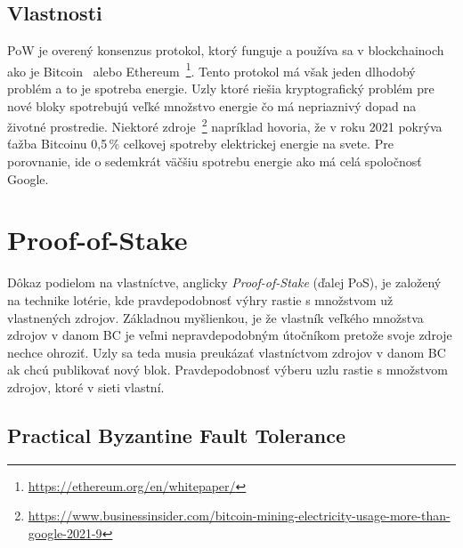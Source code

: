 \subsection{Vlastnosti}
PoW je overený konsenzus protokol, ktorý funguje a používa sa v blockchainoch ako je Bitcoin~\cite{satoshiBitcoin} alebo Ethereum~\footnote{\url{https://ethereum.org/en/whitepaper/}}. Tento protokol má však jeden dlhodobý problém a to je spotreba energie. Uzly ktoré riešia kryptografický problém pre nové bloky spotrebujú veľké množstvo energie čo má nepriaznivý dopad na životné prostredie. Niektoré zdroje~\footnote{\url{https://www.businessinsider.com/bitcoin-mining-electricity-usage-more-than-google-2021-9}} napríklad hovoria, že v roku 2021 pokrýva ťažba Bitcoinu 0,5\,\% celkovej spotreby elektrickej energie na svete. Pre porovnanie, ide o sedemkrát väčšiu spotrebu energie ako má celá spoločnosť Google.~\cite{leporeConsensus}

\section{Proof-of-Stake}\label{sec:pos}

Dôkaz podielom na vlastníctve, anglicky \textit{Proof-of-Stake} (ďalej PoS), je založený na technike lotérie, kde pravdepodobnosť výhry rastie s množstvom už vlastnených zdrojov. Základnou myšlienkou, je že vlastník veľkého množstva zdrojov v danom BC je veľmi nepravdepodobným útočníkom pretože svoje zdroje nechce ohroziť. Uzly sa teda musia preukázať vlastníctvom zdrojov v danom BC ak chcú publikovať nový blok. Pravdepodobnosť výberu uzlu rastie s množstvom zdrojov, ktoré v sieti vlastní.~\cite{homoliakBlockchain, nguyenPos}

\subsection{Practical Byzantine Fault Tolerance}\label{subsec:pos-pbft}

